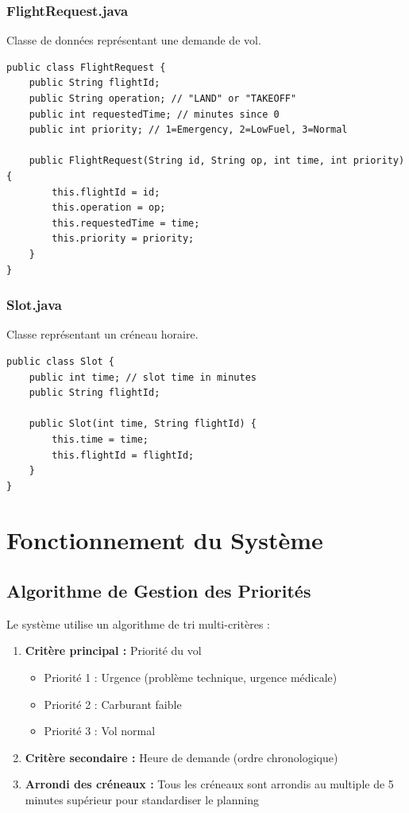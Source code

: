 \documentclass[12pt,a4paper]{article}
\begin{document}
\subsubsection{FlightRequest.java}

Classe de données représentant une demande de vol.

\begin{lstlisting}[caption=FlightRequest.java]
public class FlightRequest {
    public String flightId;
    public String operation; // "LAND" or "TAKEOFF"
    public int requestedTime; // minutes since 0
    public int priority; // 1=Emergency, 2=LowFuel, 3=Normal

    public FlightRequest(String id, String op, int time, int priority) {
        this.flightId = id;
        this.operation = op;
        this.requestedTime = time;
        this.priority = priority;
    }
}
\end{lstlisting}

\subsubsection{Slot.java}

Classe représentant un créneau horaire.

\begin{lstlisting}[caption=Slot.java]
public class Slot {
    public int time; // slot time in minutes
    public String flightId;

    public Slot(int time, String flightId) {
        this.time = time;
        this.flightId = flightId;
    }
}
\end{lstlisting}

\section{Fonctionnement du Système}

\subsection{Algorithme de Gestion des Priorités}

Le système utilise un algorithme de tri multi-critères :

\begin{enumerate}
    \item \textbf{Critère principal :} Priorité du vol
    \begin{itemize}
        \item Priorité 1 : Urgence (problème technique, urgence médicale)
        \item Priorité 2 : Carburant faible
        \item Priorité 3 : Vol normal
    \end{itemize}

    \item \textbf{Critère secondaire :} Heure de demande (ordre chronologique)

    \item \textbf{Arrondi des créneaux :} Tous les créneaux sont arrondis au multiple de 5 minutes supérieur pour standardiser le planning
\end{enumerate}
\end{document}
